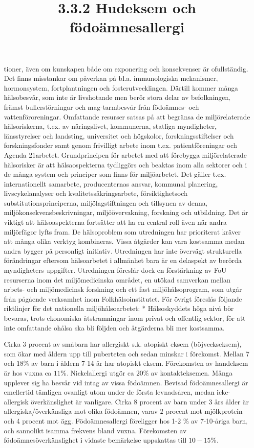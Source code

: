tioner, även om kunskapen både om exponering och konsekvenser är ofullständig. Det finns misstankar om påverkan på bl.a. immunologiska mekanismer, hormonsystem, fortplantningen och fosterutvecklingen.
Därtill kommer många hälsobesvår, som inte är livshotande men berör stora delar av befolkningen, främst bullerstörningar och mag-tarmbesvår från födoämnes- och vattenföroreningar.
Omfattande resurser satsas på att begränsa de miljörelaterade hälsoriskerna, t.ex. av näringslivet, kommunerna, statliga myndigheter, länsstyrelser och landsting, universitet och högskolor, forskningsstiftelser och forskningsfonder samt genom frivilligt arbete inom t.ex. patientföreningar och Agenda 21arbetet.
Grundprincipen för arbetet med att förebygga miljörelaterade hälsorisker är att hälsaospekterna tydliggörs och beaktas inom alla sektorer och i de många system och principer som finns för miljöarbetet. Det gäller t.ex. internationellt samarbete, producenternas ansvar, kommunal planering, livscykelanalyser och kvalitetssäkringsarbete, försiktighetsoch substitutionsprinciperna, miljölagstiftningen och tillsynen av denna, miljökonsekvensbeskrivningar, miljöövervakning, forskning och utbildning. Det är viktigt att hälsoaspekterna fortsätter att ha en central roll även när andra miljörfägor lyfts fram. De hälsoproblem som utredningen har prioriterat kräver att många olika verktyg kombineras. Vissa åtgärder kan vara kostsamma medan andra bygger på personligt initiativ.
Utredningen har inte övervägt strukturella förändringar eftersom hälsoarbetet i allmänhet bara är en delaspekt av berörda myndigheters uppgifter. Utredningen föreslår dock en förstärkning av FoU-resurserna inom det miljömedicinska området, en utökad samverkan mellan arbets- och miljömedicinsk forskning och ett fast miljöhålsoprogram, som utgår från pågående verksamhet inom Folkhälsoinstitutet.
För övrigt föreslås följande riktlinjer för det nationella miljöhålsoarbetet:
* Hälsoskyddets höga nivå bör bevaras, trots ekonomiska åtstramningar inom privat och offentlig sektor, för att inte omfattande ohålsa ska bli följden och åtgärderna bli mer kostsamma.

\title{
3.3.2 Hudeksem och födoämnesallergi
}
Cirka 3 procent av småbarn har allergiskt s.k. atopiskt eksem (böjveckseksem), som ökar med åldern upp till puberteten och sedan minskar i förekomst. Mellan 7 och \(18 \%\) av barn i åldern 7-14 år har atopiskt eksem. Förekomsten av handeksem är hos vuxna ca \(11 \%\). Nickelallergi utgör ca \(20 \%\) av kontakteksemen.
Många upplever sig ha besvår vid intag av vissa födoämnen. Bevisad födoämnesallergi är emellertid tämligen ovanligt utom under de första levnadsåren, medan icke-allergisk överkänslighet är vanligare. Cirka 8 procent av barn under 3 års ålder är allergiska/överkänsliga mot olika födoämnen, varav 2 procent mot mjölkprotein och 4 procent mot ägg. Födoämnesallergi föreligger hos 1-2 \% av 7-10-åriga barn, och sannolikt isamma frekvens bland vuxna. Förekomsten av födoämnesöverkänslighet i vidaste bemärkelse uppskattas till \(10-15 \%\).
